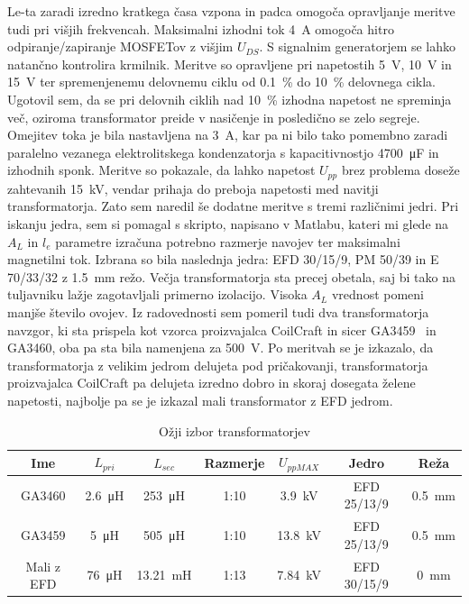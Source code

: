 \documentclass[a4paper,twoside,openright,12pt,Slovene]{book}
\begin{document}
Le-ta zaradi izredno kratkega časa vzpona in padca omogoča opravljanje meritve tudi pri višjih frekvencah. Maksimalni izhodni tok \SI{4}{\ampere} omogoča hitro odpiranje/zapiranje MOSFETov z višjim \(U_{DS}\). S signalnim generatorjem se lahko natančno kontrolira krmilnik. Meritve so opravljene pri napetostih \SI{5}{\volt}, \SI{10}{\volt} in \SI{15}{\volt} ter spremenjenemu delovnemu ciklu od \SI{0,1}{\percent} do \SI{10}{\percent} delovnega cikla. Ugotovil sem, da se pri delovnih ciklih nad \SI{10}{\percent} izhodna napetost ne spreminja več, oziroma transformator preide v nasičenje in posledično se zelo segreje. Omejitev toka je bila nastavljena na \SI{3}{\ampere}, kar pa ni bilo tako pomembno zaradi paralelno vezanega elektrolitskega kondenzatorja s kapacitivnostjo \SI{4700}{\micro\farad} in izhodnih sponk. Meritve so pokazale, da lahko napetost \(U_{pp}\) brez problema doseže zahtevanih \SI{15}{\kilo\volt}, vendar prihaja do preboja napetosti med navitji transformatorja. Zato sem naredil še dodatne meritve s tremi različnimi jedri. Pri iskanju jedra, sem si pomagal s skripto, napisano v Matlabu, kateri mi glede na \(A_L\) in \(l_e\) parametre izračuna potrebno razmerje navojev ter maksimalni magnetilni tok. Izbrana so bila naslednja jedra: EFD 30/15/9, PM 50/39 in E 70/33/32 z \SI{1,5}{\milli\meter} režo. Večja transformatorja sta precej obetala, saj bi tako na tuljavniku lažje zagotavljali primerno izolacijo. Visoka \(A_L\) vrednost pomeni manjše število ovojev. Iz radovednosti sem pomeril tudi dva transformatorja navzgor, ki sta prispela kot vzorca proizvajalca CoilCraft in sicer GA3459~\cite{Coilcraft:GA3459} in GA3460, oba pa sta bila namenjena za \SI{500}{\volt}. Po meritvah se je izkazalo, da transformatorja z velikim jedrom delujeta pod pričakovanji, transformatorja proizvajalca CoilCraft pa delujeta izredno dobro in skoraj dosegata želene napetosti, najbolje pa se je izkazal mali transformator z EFD jedrom. 
 
\begin{table}[h!]
\centering
\begin{tabular}{||c|c|c|c|c|c|c||}
\hline
Ime & \(L_{pri}\) & \(L_{sec}\) & Razmerje & \(U_{pp MAX}\) & Jedro & Reža \\ [0.5ex]
\hline\hline
GA3460 & \SI{2.6}{\micro\henry} & \SI{253}{\micro\henry} & 1:10 & \SI{3.9}{\kilo\volt} & EFD 25/13/9 & \SI{0.5}{\milli\meter} \\
\hline
GA3459 & \SI{5}{\micro\henry} & \SI{505}{\micro\henry} & 1:10 & \SI{13.8}{\kilo\volt} & EFD 25/13/9 & \SI{0.5}{\milli\meter} \\
\hline
Mali z EFD & \SI{76}{\micro\henry} & \SI{13.21}{\milli\henry} & 1:13 & \SI{7.84}{\kilo\volt} & EFD 30/15/9 & \SI{0}{\milli\meter} \\
\hline
\end{tabular}

\caption{Ožji izbor transformatorjev}

\end{table}
\end{document}
